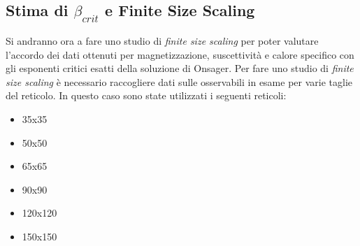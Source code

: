 \subsection*{Stima di $\beta_{crit}$ e Finite Size Scaling }

Si andranno ora a fare uno studio di \emph{finite size scaling} per poter valutare l'accordo dei dati ottenuti per magnetizzazione, suscettività e calore specifico con gli esponenti critici esatti della soluzione di Onsager.
Per fare uno studio di \emph{finite size scaling} è necessario raccogliere dati sulle osservabili in esame per varie taglie del reticolo. In questo caso sono state utilizzati i seguenti reticoli:
\begin{itemize}
\item 35x35 
\item 50x50 
\item 65x65
\item 90x90
\item 120x120 
\item 150x150
\end{itemize}

